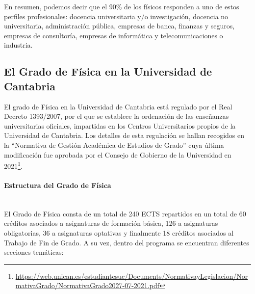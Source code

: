 En resumen, podemos decir que el 90\% de los físicos responden a uno de estos perfiles profesionales: docencia universitaria y/o investigación, docencia no universitaria, administración pública, empresas de banca, finanzas y seguros, empresas de consultoría, empresas de informática y telecomunicaciones o industria.

\subsection{El Grado de Física en la Universidad de Cantabria}

El grado de Física en la Universidad de Cantabria está regulado por el Real Decreto 1393/2007, por el que se establece la ordenación de las enseñanzas universitarias oficiales, impartidas en los Centros Universitarios propios de la Universidad de Cantabria. Los detalles de esta regulación se hallan recogidos en la ``Normativa de Gestión Académica de Estudios de Grado'' cuya última modificación fue aprobada por el Consejo de Gobierno de la Universidad en 2021\footnote{\url{https://web.unican.es/estudiantesuc/Documents/NormativayLegislacion/NormativaGrado/NormativaGrado2027-07-2021.pdf}}.

\paragraph{Estructura del Grado de Física\\\\}

El Grado de Física consta de un total de 240 ECTS repartidos en un total de 60 créditos asociados a asignaturas de formación básica, 126 a asignaturas obligatorias, 36 a asignaturas optativas y finalmente 18 créditos asociados al Trabajo de Fin de Grado. A su vez, dentro del programa se encuentran diferentes secciones temáticas: 

